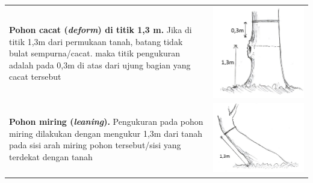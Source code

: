 \documentclass[
  oneside]{book}
\begin{document}
\begin{longtable}[]{@{}
  >{\raggedright\arraybackslash}p{}
  >{\raggedright\arraybackslash}p{}@{}}
\textbf{Pohon cacat (\emph{deform}) di titik 1,3 m.} Jika di titik 1,3m dari permukaan tanah, batang tidak bulat sempurna/cacat. maka titik pengukuran adalah pada 0,3m di atas dari ujung bagian yang cacat tersebut & \includegraphics{images/vtb2.jpg} \\
\textbf{Pohon miring (\emph{leaning}).} Pengukuran pada pohon miring dilakukan dengan mengukur 1,3m dari tanah pada sisi arah miring pohon tersebut/sisi yang terdekat dengan tanah & \includegraphics{images/vtb3.jpg} \\

\end{longtable}
\end{document}
